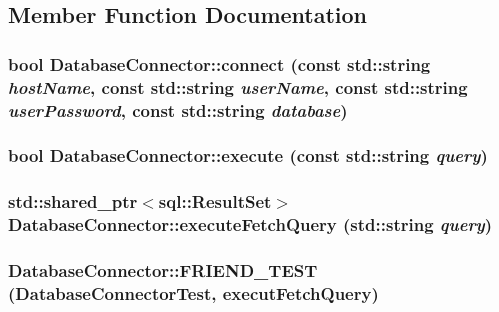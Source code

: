 \subsection{Member Function Documentation}
\hypertarget{classDatabaseConnector_aa1ee4bc9db8a6a0649cb0445f603bc3d}{
\subsubsection[{connect}]{\setlength{\rightskip}{0pt plus 5cm}bool DatabaseConnector::connect (const std::string {\em hostName}, \/  const std::string {\em userName}, \/  const std::string {\em userPassword}, \/  const std::string {\em database})}}
\label{classDatabaseConnector_aa1ee4bc9db8a6a0649cb0445f603bc3d}
\hypertarget{classDatabaseConnector_afe792ae1d992ef8ad46b4d9d96e4f046}{
\subsubsection[{execute}]{\setlength{\rightskip}{0pt plus 5cm}bool DatabaseConnector::execute (const std::string {\em query})}}
\label{classDatabaseConnector_afe792ae1d992ef8ad46b4d9d96e4f046}
\hypertarget{classDatabaseConnector_afa1229f85d1ce3aa08a8efe20355f1a8}{
\subsubsection[{executeFetchQuery}]{\setlength{\rightskip}{0pt plus 5cm}std::shared\_\-ptr$<$sql::ResultSet$>$ DatabaseConnector::executeFetchQuery (std::string {\em query})}}
\label{classDatabaseConnector_afa1229f85d1ce3aa08a8efe20355f1a8}
\hypertarget{classDatabaseConnector_a1b954199c3e493a12edb9b339ad26103}{
\subsubsection[{FRIEND\_\-TEST}]{\setlength{\rightskip}{0pt plus 5cm}DatabaseConnector::FRIEND\_\-TEST (DatabaseConnectorTest, \/  executFetchQuery)}}
